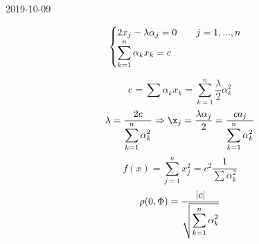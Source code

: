 \documentclass[12pt, fleqn]{article}
\begin{document}
\begin{lect} {2019-10-09}
\begin{Example}
\[\begin{cases}
		2x_j - \lambda \alpha_j = 0 \qquad j = 1, ..., n\\
		\displaystyle \sum_{k = 1}^n \alpha_k x_k = c \end{cases}\]

		\[c = \sum \alpha_k x_k = \sum_{k = 1}^n \frac{\lambda}{2} \alpha^2_k \]
		\[\lambda = \frac{2c}{\displaystyle \sum_{k = 1}^n  \alpha_k^2} \Ra 
		\x_j = \frac{\lambda \alpha_j}{2} = \frac{c a_j}{\displaystyle \sum_{k = 1}^n \alpha_k^2}\]
		\[f(x) = \sum_{j = 1}^n x^2_j = c^2 \frac{1}{\displaystyle \sum \alpha_k^2} \]
		\[\rho(0, \Phi) = \frac{\left|c\right|}{\sqrt{\displaystyle \sum^n_{k = 1} \alpha_k^2 }}\]
	\end{Example}
\end{lect}
\end{document}
